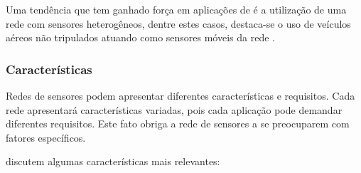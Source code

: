 Uma tendência que tem ganhado força em aplicações de \rssf é a utilização de uma rede com sensores heterogêneos, dentre estes casos, destaca-se o uso de veículos aéreos não tripulados atuando como sensores móveis da rede \cite{Freitas2009}. 


\subsubsection{Características}
Redes de sensores podem apresentar diferentes características e requisitos. Cada rede apresentará características variadas, pois cada aplicação pode demandar diferentes requisitos.
Este fato obriga a rede de sensores a se preocuparem com fatores específicos.

\cite{Loureiro} discutem algumas características mais relevantes:


